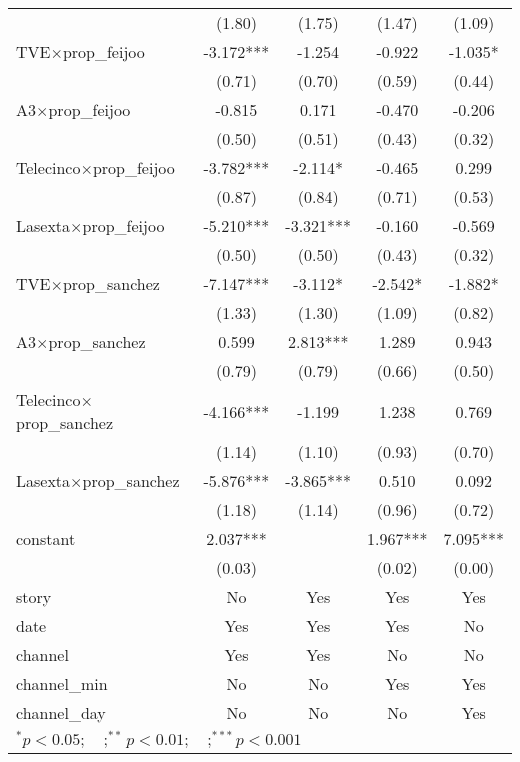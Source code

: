 \begin{tabular}{l*{4}{c}}
                    &      (1.80)   &      (1.75)   &      (1.47)   &      (1.09)   \\
TVE$\times$prop\_feijoo&      -3.172***&      -1.254   &      -0.922   &      -1.035*  \\
                    &      (0.71)   &      (0.70)   &      (0.59)   &      (0.44)   \\
A3$\times$prop\_feijoo&      -0.815   &       0.171   &      -0.470   &      -0.206   \\
                    &      (0.50)   &      (0.51)   &      (0.43)   &      (0.32)   \\
Telecinco$\times$prop\_feijoo&      -3.782***&      -2.114*  &      -0.465   &       0.299   \\
                    &      (0.87)   &      (0.84)   &      (0.71)   &      (0.53)   \\
Lasexta$\times$prop\_feijoo&      -5.210***&      -3.321***&      -0.160   &      -0.569   \\
                    &      (0.50)   &      (0.50)   &      (0.43)   &      (0.32)   \\
TVE$\times$prop\_sanchez&      -7.147***&      -3.112*  &      -2.542*  &      -1.882*  \\
                    &      (1.33)   &      (1.30)   &      (1.09)   &      (0.82)   \\
A3$\times$prop\_sanchez&       0.599   &       2.813***&       1.289   &       0.943   \\
                    &      (0.79)   &      (0.79)   &      (0.66)   &      (0.50)   \\
Telecinco$\times$prop\_sanchez&      -4.166***&      -1.199   &       1.238   &       0.769   \\
                    &      (1.14)   &      (1.10)   &      (0.93)   &      (0.70)   \\
Lasexta$\times$prop\_sanchez&      -5.876***&      -3.865***&       0.510   &       0.092   \\
                    &      (1.18)   &      (1.14)   &      (0.96)   &      (0.72)   \\
constant            &       2.037***&               &       1.967***&       7.095***\\
                    &      (0.03)   &               &      (0.02)   &      (0.00)   \\
\midrule
story               &          No   &         Yes   &         Yes   &         Yes   \\
date                &         Yes   &         Yes   &         Yes   &          No   \\
channel             &         Yes   &         Yes   &          No   &          No   \\
channel\_min         &          No   &          No   &         Yes   &         Yes   \\
channel\_day         &          No   &          No   &          No   &         Yes   \\
\bottomrule
\multicolumn{5}{l}{\footnotesize $^{*}p<0.05; \quad ; ^{**} p<0.01; \quad ; ^{***}p<0.001$}\\
\end{tabular}
